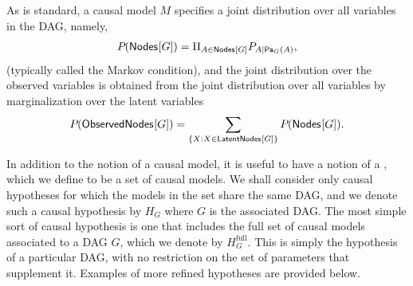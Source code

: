 As is standard, a causal model $M$ specifies a joint distribution over all variables in the DAG, namely,
\begin{align}
\pdf{\SmallNamedFunction{Nodes}{G}} = \Pi_{A\in \SmallNamedFunction{Nodes}{G}} \pfunc{A|\Pa[G]{A}},
\end{align}
(typically called the Markov condition), 
and the joint distribution over the observed variables is obtained from the joint distribution over all variables by marginalization over the latent variables 
\begin{align}
\pdf{\SmallNamedFunction{ObservedNodes}{G}} =  \sum_{\{X :X \in\SmallNamedFunction{LatentNodes}{G}\}} \pdf{\SmallNamedFunction{Nodes}{G}}.
\end{align}

In addition to the notion of a causal model, it is useful to have a notion of a , which we define to be a set of causal models.  We shall consider only causal hypotheses for which the models in the set share the same DAG, and we denote such a causal hypothesis by $H_G$ where $G$ is the associated DAG.
The most simple sort of causal hypothesis is one that includes the full set of causal models associated to a DAG $G$, which we denote by $H_G^{\textrm{full}}$.  This is simply the hypothesis of a particular DAG, with no restriction on the set of parameters that supplement it.   Examples of more refined hypotheses are provided below.

